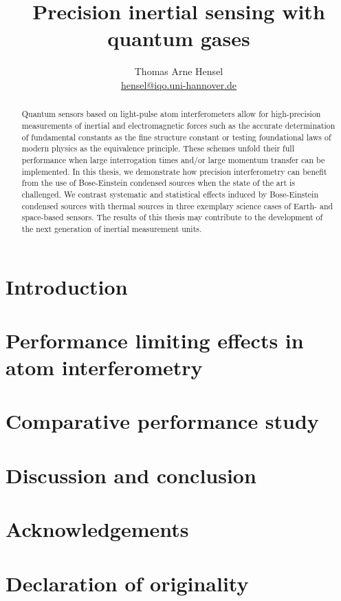 \documentclass[11pt, english, fleqn, DIV=15, headinclude, BCOR=2cm, twoside, abstract=true]{scrartcl}
\title{Precision inertial sensing with quantum gases}
\author{%
    Thomas Arne Hensel \\
    \small{\href{mailto:hensel@iqo.uni-hannover.de}{hensel@iqo.uni-hannover.de}}
}
\begin{document}
%
%

%
\begin{abstract}
	Quantum sensors based on light-pulse atom interferometers allow for 
	high-precision measurements of inertial and electromagnetic forces 
	such as the accurate determination of fundamental constants as the 
	fine structure constant or testing foundational laws of modern physics 
	as the equivalence principle.
	These schemes unfold their full performance when large interrogation 
	times and/or large momentum transfer can be implemented.
	In this thesis, we demonstrate how precision interferometry can 
	benefit from the use of Bose-Einstein condensed sources when the 
	state of the art is challenged.
	We contrast systematic and statistical effects induced by 
	Bose-Einstein condensed sources with thermal sources in three 
	exemplary science cases of Earth- and space-based sensors. The 
	results of this thesis may contribute to the development of the 
	next generation of inertial measurement units.
\end{abstract}
\newpage
%
\tableofcontents
\newpage
\section{Introduction}
\label{intro}

%
\section{Performance limiting effects in atom interferometry}
\label{sec:physics}

%
\section{Comparative performance study}\label{sec:examples}

%
\section{Discussion and conclusion}

%
\section{Acknowledgements}

%
\section{Declaration of originality}

\newpage
%
\end{document}
